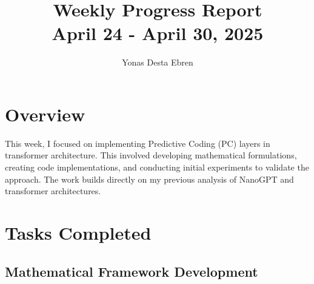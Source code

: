 \documentclass{article}
\title{\textbf{Weekly Progress Report}\\[0.5em]\Large{April 24 - April 30, 2025}}
\author{Yonas Desta Ebren}
\date{}
\begin{document}
\maketitle

\section{Overview}
This week, I focused on implementing Predictive Coding (PC) layers in transformer architecture. This involved developing mathematical formulations, creating code implementations, and conducting initial experiments to validate the approach. The work builds directly on my previous analysis of NanoGPT and transformer architectures.

\section{Tasks Completed}

\subsection{Mathematical Framework Development}
\end{document}
